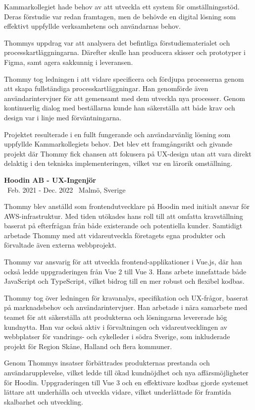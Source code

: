 \documentclass[a4paper,10pt]{article}
\begin{document}
Kammarkollegiet hade behov av att utveckla ett system för omställningsstöd. Deras förstudie var redan framtagen, men de behövde en digital lösning som effektivt uppfyllde verksamhetens och användarnas behov.

Thommys uppdrag var att analysera det befintliga förstudiematerialet och processkartläggningarna. Därefter skulle han producera skisser och prototyper i Figma, samt agera sakkunnig i leveransen.

Thommy tog ledningen i att vidare specificera och fördjupa processerna genom att skapa fullständiga processkartläggningar. Han genomförde även användarintervjuer för att gemensamt med dem utveckla nya processer. Genom kontinuerlig dialog med beställarna kunde han säkerställa att både krav och design var i linje med förväntningarna.

Projektet resulterade i en fullt fungerande och användarvänlig lösning som uppfyllde Kammarkollegiets behov. Det blev ett framgångsrikt och givande projekt där Thommy fick chansen att fokusera på UX-design utan att vara direkt delaktig i den tekniska implementeringen, vilket var en lärorik omställning.

\vspace{0.5cm}
\textbf{Hoodin AB - UX-Ingenjör}\\
\normalsize \faCalendar \ Feb. 2021 - Dec. 2022 \quad \faMapMarker \ Malmö, Sverige

Thommy blev anställd som frontendutvecklare på Hoodin med initialt ansvar för AWS-infrastruktur. Med tiden utökades hans roll till att omfatta kravställning baserat på efterfrågan från både existerande och potentiella kunder. Samtidigt arbetade Thommy med att vidareutveckla företagets egna produkter och förvaltade även externa webbprojekt.

Thommy var ansvarig för att utveckla frontend-applikationer i Vue.js, där han också ledde uppgraderingen från Vue 2 till Vue 3. Hans arbete innefattade både JavaScript och TypeScript, vilket bidrog till en mer robust och flexibel kodbas.

Thommy tog över ledningen för kravanalys, specifikation och UX-frågor, baserat på marknadsbehov och användarintervjuer. Han arbetade i nära samarbete med teamet för att säkerställa att produkterna och lösningarna levererade hög kundnytta. Han var också aktiv i förvaltningen och vidareutvecklingen av webbplatser för vandrings- och cykelleder i södra Sverige, som inkluderade projekt för Region Skåne, Halland och flera kommuner.

Genom Thommys insatser förbättrades produkternas prestanda och användarupplevelse, vilket ledde till ökad kundnöjdhet och nya affärsmöjligheter för Hoodin. Uppgraderingen till Vue 3 och en effektivare kodbas gjorde systemet lättare att underhålla och utveckla vidare, vilket underlättade för framtida skalbarhet och utveckling.
\end{document}

